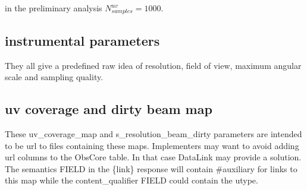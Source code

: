 \documentclass[11pt,a4paper]{ivoa}
\begin{document}
in the preliminary analysis $N^{uv}_{samples} = 1000$.

\subsection{instrumental parameters}

They all give a predefined raw idea of resolution, field of view, maximum angular scale and sampling quality.

\subsection{uv coverage and dirty beam map}

These uv\_coverage\_map and s\_resolution\_beam\_dirty parameters are  intended to be url to files containing these maps. 
Implementers may want to avoid adding url columns to the ObsCore table. In that case DataLink \citep{std:DataLink} may provide a solution. The semantics FIELD in the \{link\} response    will contain \#auxiliary  for links to this map while  the content\_qualifier FIELD could contain the utype.
\end{document}
